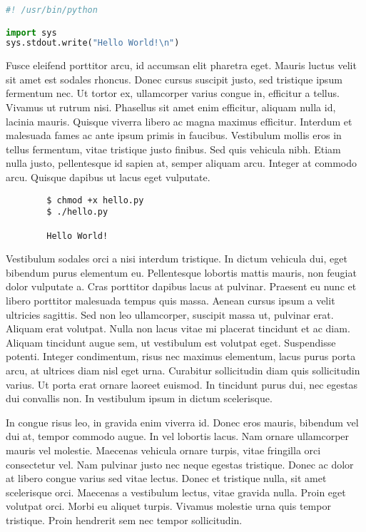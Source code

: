 \documentclass{article}
\begin{document}
\begin{file}[hello.py]
\begin{lstlisting}[language=Python]
#! /usr/bin/python

import sys
sys.stdout.write("Hello World!\n")
\end{lstlisting}
\end{file}

Fusce eleifend porttitor arcu, id accumsan elit pharetra eget. Mauris luctus velit sit amet est sodales rhoncus. Donec cursus suscipit justo, sed tristique ipsum fermentum nec. Ut tortor ex, ullamcorper varius congue in, efficitur a tellus. Vivamus ut rutrum nisi. Phasellus sit amet enim efficitur, aliquam nulla id, lacinia mauris. Quisque viverra libero ac magna maximus efficitur. Interdum et malesuada fames ac ante ipsum primis in faucibus. Vestibulum mollis eros in tellus fermentum, vitae tristique justo finibus. Sed quis vehicula nibh. Etiam nulla justo, pellentesque id sapien at, semper aliquam arcu. Integer at commodo arcu. Quisque dapibus ut lacus eget vulputate.

\begin{commandline}
	\begin{verbatim}
		$ chmod +x hello.py
		$ ./hello.py

		Hello World!
	\end{verbatim}
\end{commandline}

Vestibulum sodales orci a nisi interdum tristique. In dictum vehicula dui, eget bibendum purus elementum eu. Pellentesque lobortis mattis mauris, non feugiat dolor vulputate a. Cras porttitor dapibus lacus at pulvinar. Praesent eu nunc et libero porttitor malesuada tempus quis massa. Aenean cursus ipsum a velit ultricies sagittis. Sed non leo ullamcorper, suscipit massa ut, pulvinar erat. Aliquam erat volutpat. Nulla non lacus vitae mi placerat tincidunt et ac diam. Aliquam tincidunt augue sem, ut vestibulum est volutpat eget. Suspendisse potenti. Integer condimentum, risus nec maximus elementum, lacus purus porta arcu, at ultrices diam nisl eget urna. Curabitur sollicitudin diam quis sollicitudin varius. Ut porta erat ornare laoreet euismod. In tincidunt purus dui, nec egestas dui convallis non. In vestibulum ipsum in dictum scelerisque.

\begin{warn}[Notice:]
  In congue risus leo, in gravida enim viverra id. Donec eros mauris, bibendum vel dui at, tempor commodo augue. In vel lobortis lacus. Nam ornare ullamcorper mauris vel molestie. Maecenas vehicula ornare turpis, vitae fringilla orci consectetur vel. Nam pulvinar justo nec neque egestas tristique. Donec ac dolor at libero congue varius sed vitae lectus. Donec et tristique nulla, sit amet scelerisque orci. Maecenas a vestibulum lectus, vitae gravida nulla. Proin eget volutpat orci. Morbi eu aliquet turpis. Vivamus molestie urna quis tempor tristique. Proin hendrerit sem nec tempor sollicitudin.
\end{warn}
\end{document}
